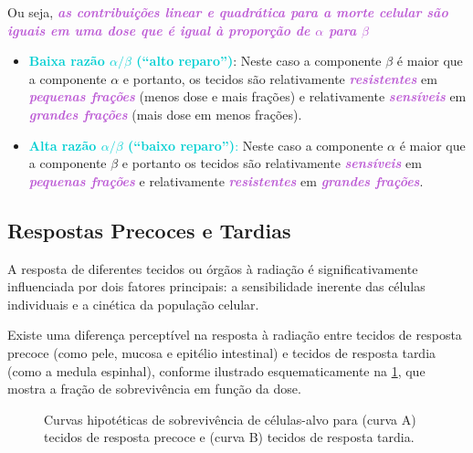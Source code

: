 \documentclass[11pt,a4paper]{article}
\begin{document}
	Ou seja, \textcolor{MediumOrchid}{\textbf{\textit{as contribuições linear e quadrática para a morte celular são iguais em uma dose que é igual à proporção de $\alpha$ para $\beta$}}}

	\begin{itemize}
		\item \textcolor{DarkTurquoise}{\textbf{Baixa razão $\alpha/\beta$  (“alto reparo”)}}:  Neste caso a componente $\beta$ é maior que a componente $\alpha$ e portanto, os tecidos são relativamente \textcolor{MediumOrchid}{\textbf{\textit{resistentes}}} em \textcolor{MediumOrchid}{\textbf{\textit{pequenas frações}}} (menos dose e mais frações) e relativamente \textcolor{MediumOrchid}{\textbf{\textit{sensíveis}}} em \textcolor{MediumOrchid}{\textbf{\textit{grandes frações}}} (mais dose em menos frações). 
		\item \textcolor{DarkTurquoise}{\textbf{Alta razão $\alpha/\beta$ (“baixo reparo”)}:} Neste caso a componente $\alpha$ é maior que a componente $\beta$ e portanto os tecidos são relativamente \textcolor{MediumOrchid}{\textbf{\textit{sensíveis}}} em \textcolor{MediumOrchid}{\textbf{\textit{pequenas frações}}} e relativamente \textcolor{MediumOrchid}{\textbf{\textit{resistentes}}} em \textcolor{MediumOrchid}{\textbf{\textit{grandes frações}}}.
	\end{itemize}


\subsection*{Respostas Precoces e Tardias}

	A resposta de diferentes tecidos ou órgãos à radiação é significativamente influenciada por dois fatores principais: a sensibilidade inerente das células individuais e a cinética da população celular.

	Existe uma diferença perceptível na resposta à radiação entre tecidos de resposta precoce (como pele, mucosa e epitélio intestinal) e tecidos de resposta tardia (como a medula espinhal), conforme ilustrado esquematicamente na \ref{fig:respostaTardiaEImediata}, que mostra a fração de sobrevivência em função da dose.

	\begin{figure}[h]
		\centering
		\caption{Curvas hipotéticas de sobrevivência de células-alvo para (curva A) tecidos de resposta precoce e (curva B) tecidos de resposta tardia.}
		\label{fig:respostaTardiaEImediata}
	\end{figure}
\end{document}
